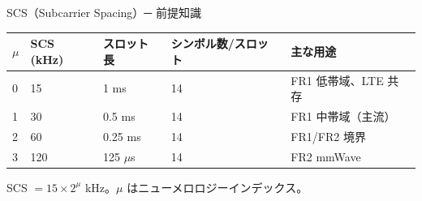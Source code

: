 \begin{frame}{SCS（Subcarrier Spacing）─ 前提知識}
\centering
\begin{tabular}{lllll}
\toprule
$\mu$ & SCS (kHz) & スロット長 & シンボル数/スロット & 主な用途 \\
\midrule
0 & 15  & 1 ms     & 14 & FR1 低帯域、LTE 共存 \\
1 & 30  & 0.5 ms   & 14 & FR1 中帯域（主流） \\
2 & 60  & 0.25 ms  & 14 & FR1/FR2 境界 \\
3 & 120 & 125 $\mu$s & 14 & FR2 mmWave \\
\bottomrule
\end{tabular}

\vspace{0.6em}
{\small SCS $= 15 \times 2^{\mu}$ kHz。$\mu$ はニューメロロジーインデックス。}
\end{frame}
